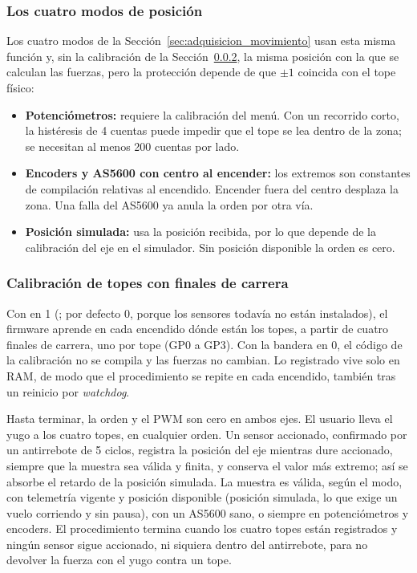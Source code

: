 \subsubsection{Los cuatro modos de posición}
Los cuatro modos de la Sección~\ref{sec:adquisicion_movimiento} usan esta misma función y, sin la calibración de la Sección~\ref{sec:calibracion_topes}, la misma posición con la que se calculan las fuerzas, pero la protección depende de que $\pm1$ coincida con el tope físico:
\begin{itemize}
\item \textbf{Potenciómetros:} requiere la calibración del menú. Con un recorrido corto, la histéresis de 4 cuentas puede impedir que el tope se lea dentro de la zona; se necesitan al menos 200 cuentas por lado.
\item \textbf{Encoders y AS5600 con centro al encender:} los extremos son constantes de compilación relativas al encendido. Encender fuera del centro desplaza la zona. Una falla del AS5600 ya anula la orden por otra vía.
\item \textbf{Posición simulada:} usa la posición recibida, por lo que depende de la calibración del eje en el simulador. Sin posición disponible la orden es cero.
\end{itemize}

\subsubsection{Calibración de topes con finales de carrera}
\label{sec:calibracion_topes}
Con  en 1 (; por defecto 0, porque los sensores todavía no están instalados), el firmware aprende en cada encendido dónde están los topes, a partir de cuatro finales de carrera, uno por tope (GP0 a GP3). Con la bandera en 0, el código de la calibración no se compila y las fuerzas no cambian. Lo registrado vive solo en RAM, de modo que el procedimiento se repite en cada encendido, también tras un reinicio por \emph{watchdog}.

Hasta terminar, la orden y el PWM son cero en ambos ejes. El usuario lleva el yugo a los cuatro topes, en cualquier orden. Un sensor accionado, confirmado por un antirrebote de 5 ciclos, registra la posición del eje mientras dure accionado, siempre que la muestra sea válida y finita, y conserva el valor más extremo; así se absorbe el retardo de la posición simulada. La muestra es válida, según el modo, con telemetría vigente y posición disponible (posición simulada, lo que exige un vuelo corriendo y sin pausa), con un AS5600 sano, o siempre en potenciómetros y encoders. El procedimiento termina cuando los cuatro topes están registrados y ningún sensor sigue accionado, ni siquiera dentro del antirrebote, para no devolver la fuerza con el yugo contra un tope.

